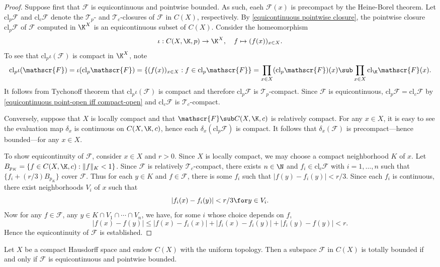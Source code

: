 \begin{proof}
Suppose first that $\mathscr{F}$ is equicontinuous and pointwise bounded. As such, eaeh $\mathscr{F}(x)$ is precompact by the Heine-Borel theorem. Let $\mathrm{cl}_p\mathscr{F}$ and $\mathrm{cl}_c\mathscr{F}$ denote the $\mathcal{T}_p$- and $\mathcal{T}_c$-closures of $\mathscr{F}$ in $C(X)$, respectively. By \cref{equicontinuous pointwise closure}, the pointwise closure $\mathrm{cl}_p\mathscr{F}$ of $\mathscr{F}$ computed in $\K^X$ is an equicontinuous subset of $C(X)$. Consider the homeomorphism
\[\iota:C(X,\K,p)\to\K^X,\quad f\mapsto (f(x))_{x\in X}.\]
To see that $\mathrm{cl}_p\iota(\mathscr{F})$ is compact in $\K^X$, note
\[\mathrm{cl}_p\iota(\mathscr{F})=\iota(\mathrm{cl}_p\mathscr{F})=\{(f(x))_{x\in X}:f\in\mathrm{cl}_p\mathscr{F}\}=\prod_{x\in X}(\mathrm{cl}_p\mathscr{F})(x)\sub\prod_{x\in X}\mathrm{cl}_{\K}\mathscr{F}(x).\]
It follows from Tychonoff theorem that $\mathrm{cl}_p\iota(\mathscr{F})$ is compact and therefore $\mathrm{cl}_p\mathscr{F}$ is $\mathcal{T}_p$-compact. Since $\mathscr{F}$ is equicontinuous, $\mathrm{cl}_p\mathscr{F}=\mathrm{cl}_c\mathscr{F}$ by \cref{equicontinuous point-open iff compact-open} and $\mathrm{cl}_c\mathscr{F}$ is $\mathcal{T}_c$-compact.\par
Conversely, suppose that $X$ is locally compact and that $\mathscr{F}\sub C(X,\K,c)$ is relatively compact. For any $x\in X$, it is easy to see the evaluation map $\delta_x$ is continuous on $C(X,\K,c)$, hence each $\delta_x(\mathrm{cl}_p\mathscr{F})$ is compact. It follows that $\delta_x(\mathscr{F})$ is precompact---hence bounded---for any $x\in X$.\par
To show equicontinuity of $\mathscr{F}$, consider $x\in X$ and $r>0$. Since $X$ is locally compact, we may choose a compact neighborhood $K$ of $x$. Let $B_{p_K}=\{f\in C(X,\K,c):\|f\|_K<1\}$. Since $\mathscr{F}$ is relatively $\mathcal{T}_c$-compact, there exists $n\in\N$ and $f_i\in\mathrm{cl}_c\mathscr{F}$ with $i=1,\dots,n$ such that $\{f_i+(r/3)B_{p_K}\}$ cover $\mathscr{F}$. Thus for each $y\in K$ and $f\in \mathscr{F}$, there is some $f_i$ such that $|f(y)-f_i(y)|<r/3$. Since each $f_i$ is continuous, there exist neighborhoods $V_i$ of $x$ such that
\[|f_i(x)-f_i(y)|<r/3\for y\in V_i.\]
Now for any $f\in \mathscr{F}$, any $y\in K\cap V_1\cap\cdots\cap V_n$, we have, for some $i$ whose choice depends on $f$,
\[|f(x)-f(y)|\leq|f(x)-f_i(x)|+|f_i(x)-f_i(y)|+|f_i(y)-f(y)|<r.\]
Hence the equicontinuity of $\mathscr{F}$ is established.
\end{proof}
\begin{theorem}\label{Arzel\'a-Ascoli totally bounded iff equi+point}
Let $X$ be a compact Hausdorff space and endow $C(X)$ with the uniform topology. Then a subspace $\mathscr{F}$ in $C(X)$ is totally bounded if and only if $\mathscr{F}$ is equicontinuous and pointwise bounded.
\end{theorem}

